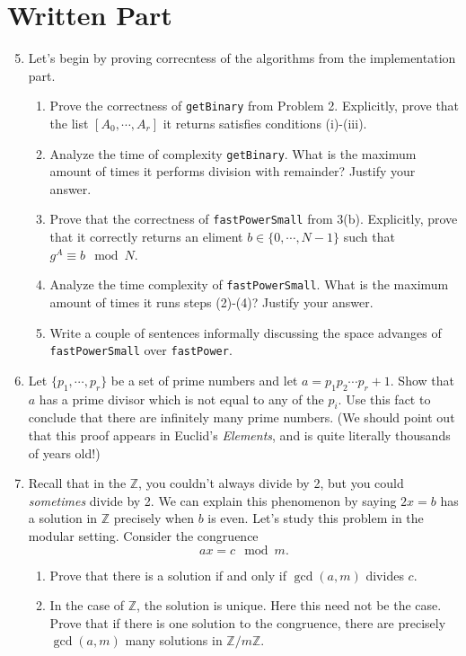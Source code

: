 \documentclass[11pt]{article}
\newcommand{\bZ}{\mathbb{Z}}
\begin{document}
\section*{Written Part}
\begin{enumerate}
  \setcounter{enumi}{4}
  \item{
  Let's begin by proving correcntess of the algorithms from the implementation part.
  \begin{enumerate}
    \item{
    Prove the correctness of \verb|getBinary| from Problem 2.  Explicitly, prove that the list $[A_0,\cdots,A_r]$ it returns satisfies conditions (i)-(iii).
    }
    \item{
    Analyze the time of complexity \verb|getBinary|.  What is the maximum amount of times it performs division with remainder?  Justify your answer.
    }
    \item{
    Prove that the correctness of \verb|fastPowerSmall| from 3(b).  Explicitly, prove that it correctly returns an eliment $b\in\{0,\cdots,N-1\}$ such that $g^A\equiv b\mod N$.
    }
    \item{
    Analyze the time complexity of \verb|fastPowerSmall|.  What is the maximum amount of times it runs steps (2)-(4)?  Justify your answer.
    }
    \item{
    Write a couple of sentences informally discussing the space advanges of \verb|fastPowerSmall| over \verb|fastPower|.
    }
  \end{enumerate}
  }
  \item{
  Let $\{p_1,\cdots,p_r\}$ be a set of prime numbers and let $a = p_1p_2\cdots p_r + 1$.  Show that $a$ has a prime divisor which is not equal to any of the $p_i$.  Use this fact to conclude that there are infinitely many prime numbers.  (We should point out that this proof appears in Euclid's \textit{Elements}, and is quite literally thousands of years old!)
  }
  \item{
  Recall that in the $\bZ$, you couldn't always divide by 2, but you could \textit{sometimes} divide by 2.  We can explain this phenomenon by saying $2x = b$ has a solution in $\bZ$ precisely when $b$ is even.  Let's study this problem in the modular setting. Consider the congruence
  \[ax = c\mod m.\]
  \begin{enumerate}
    \item{
    Prove that there is a solution if and only if $\gcd(a,m)$ divides $c$.
    }
    \item{
    In the case of $\bZ$, the solution is unique.  Here this need not be the case.  Prove that if there is one solution to the congruence, there are precisely $\gcd(a,m)$ many solutions in $\bZ/m\bZ$.
}
\end{enumerate}}
\end{enumerate}
\end{document}
